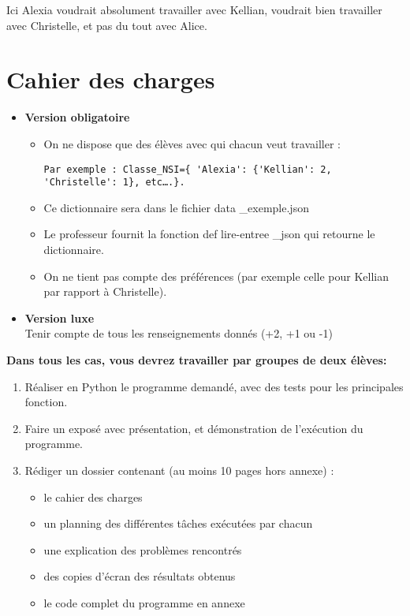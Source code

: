 \documentclass[12pt]{article}
\begin{document}
Ici Alexia voudrait absolument travailler avec Kellian, voudrait bien travailler avec Christelle, et pas du tout avec Alice.\\

\medskip

\section{Cahier des charges }

\begin{itemize}
 
\item [\textbullet] \textbf{Version obligatoire}


\begin{itemize}
 
\item [\textbullet] On ne dispose que des élèves avec qui chacun veut travailler : 
\begin{verbatim}
Par exemple : Classe_NSI={ 'Alexia': {'Kellian': 2, 'Christelle': 1}, etc….}.  
\end{verbatim}
\item [\textbullet] Ce dictionnaire sera dans le fichier data \_exemple.json  
\item [\textbullet]Le professeur fournit la fonction def lire-entree \_json qui retourne le dictionnaire.
\item [\textbullet] On ne tient pas compte des préférences (par exemple celle pour Kellian par rapport à Christelle).  
\end{itemize}
\item [\textbullet] \textbf{Version luxe}\\
Tenir compte de tous les renseignements donnés (+2, +1 ou -1)
\end{itemize}
\vspace{1cm}
\medskip

\setlength\parindent{20mm}
\textbf{Dans tous les cas, vous devrez travailler par groupes de deux élèves:}
\setlength\parindent{0mm}


\begin{enumerate}
    \item Réaliser en Python le programme demandé, avec des tests pour les principales fonction.
    \item Faire un exposé avec présentation, et démonstration de l'exécution du programme.
    \item Rédiger un dossier contenant (au moins 10 pages hors annexe) :
    \begin{itemize}
        \item [\textbullet] le cahier des charges
        \item [\textbullet] un planning des différentes tâches exécutées par chacun
        \item [\textbullet] une explication des problèmes rencontrés
        \item [\textbullet] des copies d'écran des résultats obtenus
        \item [\textbullet] le code complet du programme en annexe
    \end{itemize}
\end{enumerate}
 
\end{document}
